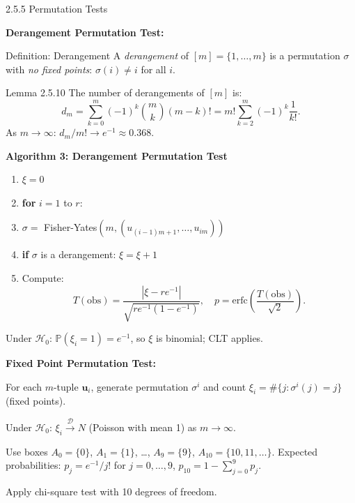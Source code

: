 \documentclass[aspectratio=169,10pt]{beamer}
\begin{document}
\begin{frame}[allowframebreaks]{2.5.5 Permutation Tests}

\textbf{Derangement Permutation Test:}

\begin{block}{Definition: Derangement}
A \emph{derangement} of $[m] = \{1,\ldots,m\}$ is a permutation $\sigma$ with
\emph{no fixed points}: $\sigma(i) \ne i$ for all $i$.
\end{block}

\begin{block}{Lemma 2.5.10}
The number of derangements of $[m]$ is:
\[
  d_m = \sum_{k=0}^m (-1)^k \binom{m}{k}(m-k)! = m!\sum_{k=2}^m (-1)^k \frac{1}{k!}.
\]
As $m\to\infty$: $d_m/m! \to e^{-1} \approx 0.368$.
\end{block}

\framebreak

\textbf{Algorithm 3: Derangement Permutation Test}
\begin{enumerate}
  \item $\xi = 0$
  \item \textbf{for} $i=1$ to $r$:
  \item \quad $\sigma = $ Fisher-Yates$(m, (u_{(i-1)m+1},\ldots,u_{im}))$
  \item \quad \textbf{if} $\sigma$ is a derangement: $\xi = \xi + 1$
  \item Compute:
  \[
    T(\text{obs}) = \frac{|\xi - r e^{-1}|}{\sqrt{r e^{-1}(1-e^{-1})}},
    \quad p = \mathrm{erfc}\!\left(\frac{T(\text{obs})}{\sqrt{2}}\right).
  \]
\end{enumerate}

Under $\mathcal{H}_0$: $\mathbb{P}(\xi_i = 1) = e^{-1}$, so $\xi$ is binomial; CLT applies.

\framebreak

\textbf{Fixed Point Permutation Test:}

For each $m$-tuple $\mathbf{u}_i$, generate permutation $\sigma^i$ and count
$\xi_i = \#\{j : \sigma^i(j) = j\}$ (fixed points).

Under $\mathcal{H}_0$: $\xi_i \xrightarrow{\mathcal{D}} N$ (Poisson with mean 1) as $m\to\infty$.

\medskip
Use boxes $A_0 = \{0\}$, $A_1 = \{1\}$, \ldots, $A_9 = \{9\}$, $A_{10} = \{10,11,\ldots\}$.
Expected probabilities: $p_j = e^{-1}/j!$ for $j=0,\ldots,9$, $p_{10} = 1-\sum_{j=0}^9 p_j$.

Apply chi-square test with 10 degrees of freedom.

\end{frame}
\end{document}
